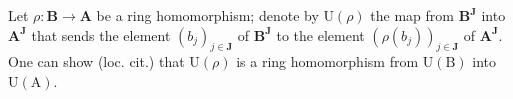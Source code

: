 Let \(\rho: \mathbf{B} \to \mathbf{A}\) be a ring homomorphism; denote by \(\mathrm{U}(\rho)\) the map from \(\mathbf{B}^{\mathbf{J}}\) into \(\mathbf{A}^{\mathbf{J}}\) that sends the element \((b_j)_{j \in \mathbf{J}}\) of \(\mathbf{B}^{\mathbf{J}}\) to the element \((\rho(b_j))_{j \in \mathbf{J}}\) of \(\mathbf{A}^{\mathbf{J}}\). One can show (loc. cit.) that \(\mathrm{U}(\rho)\) is a ring homomorphism from \(\mathrm{U}(\mathrm{B})\) into \(\mathrm{U}(\mathrm{A})\).
\relax{}
